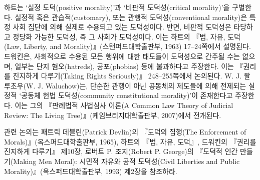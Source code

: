 { 하트는 `실정
도덕(positive morality)'과 `비판적 도덕성(critical morality)'을
구별한다. 실정적 혹은 관습적(customary), 또는 관행적 도덕성(conventional
morality)은 특정 사회 집단에 의해 실제로 수용되고 있는 도덕성이다. 반면,
비판적 도덕성은 타당하고 정당화 가능한 도덕성, 즉 그 사회가
 도덕성이다. 이는 하트의 『법,
자유, 도덕(Law, Liberty, and Morality)』(스탠퍼드대학출판부, 1963)
17--24쪽에서 설명된다. 드워킨은, 사회적으로 수용된 모든 행위에 대한
태도들이 도덕성으로 간주될 수는 없으며, 일부는 단지 혐오(hatreds),
공포(phobias) 등에 불과하다고 주장한다. 이는 『권리를 진지하게
다루기(Taking Rights Seriously)』 248--255쪽에서 논의된다. W. J.
왈루초우(W. J. Waluchow)는, 단순한 관행이 아닌 공동체의 제도들에 의해
전제되는 실정적 `공동체 헌법 도덕성(community constitutional
morality)'이 존재한다고 주장한다. 이는 그의 『판례법적 사법심사 이론(A
Common Law Theory of Judicial Review: The Living
Tree)』(케임브리지대학출판부, 2007)에서 전개된다.

관련 논의는 패트릭 데블린(Patrick Devlin)의 『도덕의 집행(The
Enforcement of Morals)』(옥스퍼드대학출판부, 1965), 하트의 『법, 자유,
도덕』, 드워킨의 『권리를 진지하게 다루기』 제10장, 로버트 P.
조지(Robert P. George)의 『도덕적 인간 만들기(Making Men Moral): 시민적
자유와 공적 도덕성(Civil Liberties and Public
Morality)』(옥스퍼드대학출판부, 1993) 제2장을 참조하라.

}